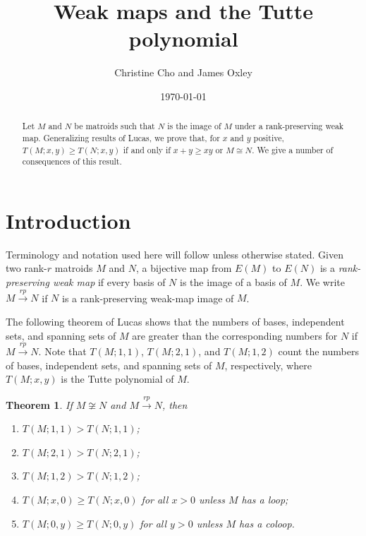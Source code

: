 \documentclass[12pt,reqno]{amsart}
\newtheorem{theorem}{Theorem}
\theoremstyle{definition}
\theoremstyle{remark}
\numberwithin{equation}{section}
\begin{document}
\title{Weak maps and the Tutte polynomial}

\author{Christine Cho and James Oxley}
\address{Mathematics Department\\
  Louisiana State University\\
  Baton Rouge, Louisiana}


\date{\today}

\begin{abstract}
    Let $M$ and $N$ be matroids such that $N$ is the image of $M$ under a rank-preserving weak map. 
    Generalizing results of Lucas, we prove that, for $x$ and $y$ positive, $T(M;x,y)\geq T(N;x,y)$ if and only if $x+y\geq xy$ or $M\cong N$. 
    We give a number of consequences of this result. 
\end{abstract}

\maketitle
\section{Introduction}

Terminology and notation used here will follow \cite{ox} unless otherwise stated.
Given two rank-$r$ matroids $M$ and $N$, a bijective map from $E(M)$ to $E(N)$ is a \textit{rank-preserving weak map} if every basis of $N$ is the image of a basis of $M$. 
We write $M\xrightarrow{rp} N$ if $N$ is a rank-preserving weak-map image of $M$. 

The following theorem of Lucas \cite{lucas} shows that the numbers of bases, independent sets, and spanning sets of $M$ are greater than the corresponding numbers for $N$ if $M\xrightarrow{rp} N$.
Note that $T(M;1,1)$, $T(M;2,1)$, and $T(M;1,2)$ count the numbers of bases, independent sets, and spanning sets of $M$, respectively, where $T(M;x,y)$ is the Tutte polynomial of $M$. 

    \begin{theorem}\label{lucas}
        If $M\not\cong N$ and $M\xrightarrow{rp}N$, then  
        \begin{enumerate}[label=(\roman*)]
           \item $T(M;1,1)>T(N;1,1)$;
           \item $T(M;2,1)>T(N;2,1)$;
           \item $T(M;1,2)>T(N;1,2)$; 
           \item $T(M;x,0)\geq T(N;x,0)$ for all $x>0$ unless $M$ has a loop;
           \item $T(M;0,y)\geq T(N;0,y)$ for all $y>0$ unless $M$ has a coloop. 
       \end{enumerate} 
    \end{theorem}
\end{document}
